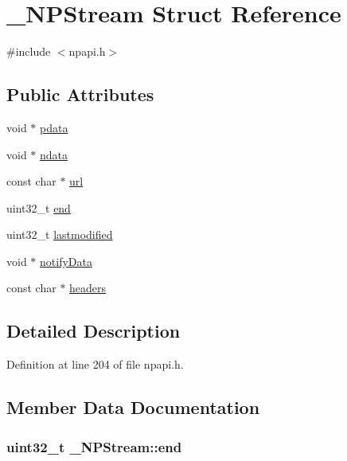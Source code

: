 \hypertarget{struct___n_p_stream}{
\section{\_\-NPStream Struct Reference}
\label{struct___n_p_stream}
}


{\ttfamily \#include $<$npapi.h$>$}

\subsection*{Public Attributes}
\begin{DoxyCompactItemize}
\item 
void $\ast$ \hyperlink{struct___n_p_stream_a140226c99a9260cc421166c426973d31}{pdata}
\item 
void $\ast$ \hyperlink{struct___n_p_stream_a54536dc05130cae4e6fea0d000eec74e}{ndata}
\item 
const char $\ast$ \hyperlink{struct___n_p_stream_a9a7484e81a72b591f97bb176536c5a83}{url}
\item 
uint32\_\-t \hyperlink{struct___n_p_stream_af8fa91dfcb5ee537bfff7c9a615736bc}{end}
\item 
uint32\_\-t \hyperlink{struct___n_p_stream_aebb004f9e61be47fa87ffd114e18ba39}{lastmodified}
\item 
void $\ast$ \hyperlink{struct___n_p_stream_af1d340c461ec06c3b763a644b63e7d0f}{notifyData}
\item 
const char $\ast$ \hyperlink{struct___n_p_stream_a5a7c75fa7838035e29cfe03822e5a38c}{headers}
\end{DoxyCompactItemize}


\subsection{Detailed Description}


Definition at line 204 of file npapi.h.



\subsection{Member Data Documentation}
\hypertarget{struct___n_p_stream_af8fa91dfcb5ee537bfff7c9a615736bc}{
\subsubsection[{end}]{\setlength{\rightskip}{0pt plus 5cm}uint32\_\-t {\bf \_\-NPStream::end}}}
\label{struct___n_p_stream_af8fa91dfcb5ee537bfff7c9a615736bc}


